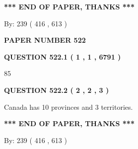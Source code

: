 \documentclass[12pt]{article}
\begin{document}
   
   
\vspace{1.0in} 
{\textbf{\large{ *** END OF PAPER, THANKS *** }}} 
   
   
\hspace{1.0in} By: 
 239 ( 416 ,  613 )
   
   
   
   
\newpage 
\setcounter{page}{ 
   522001 } 
   
   
   
   
 {\textbf{ \Large{ PAPER NUMBER  522  }}}
   
   
\vspace{0.2in}
   
   
   
   
   
   
 \vspace{0.2in}
 
 
 
 
   
   
  
\vspace{0.2in}
  
{\textbf{\Large{QUESTION
522.1 
 ( 1 , 1 , 6791 )
}}}
  
  
 
 
\noindent{}

85
 
 
  
\vspace{0.2in}
  
{\textbf{\Large{QUESTION
522.2 
 ( 2 , 2 , 3 )
}}}
  
  
 
 
\noindent{}
 
 
Canada has 10  provinces and 3 territories.
 
 
 
 
   
   
 \vspace{0.2in}
 
   
   
   
   
\vspace{1.0in} 
{\textbf{\large{ *** END OF PAPER, THANKS *** }}} 
   
   
\hspace{1.0in} By: 
 239 ( 416 ,  613 )
   
\end{document}
